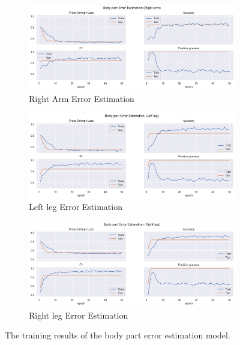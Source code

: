 \begin{figure}[htbp]
  \begin{subfigure}[b]{0.9\linewidth}
      \centering
      \includegraphics[width=\textwidth]{figures/Results/v2/bp/Right arm_ErrorEstimation.png}
      \caption{Right Arm Error Estimation}
      \label{fig:riar_lb_ee}
  \end{subfigure}
  \hfill
  \begin{subfigure}[b]{0.9\linewidth}
      \centering
      \includegraphics[width=\textwidth]{figures/Results/v2/bp/Left leg_ErrorEstimation.png}
      \caption{Left leg Error Estimation}
      \label{fig:lele_lb_ee}
  \end{subfigure}
  \hfill
  \begin{subfigure}[b]{0.9\linewidth}
      \centering
      \includegraphics[width=\textwidth]{figures/Results/v2/bp/Right leg_ErrorEstimation.png}
      \caption{Right leg Error Estimation}
      \label{fig:rileg_lb_ee}
  \end{subfigure}
  \hfill
  \caption[Limb model training results]{The training results of the body part error estimation model.}
  \label{fig:body part_training_results}
\end{figure}

